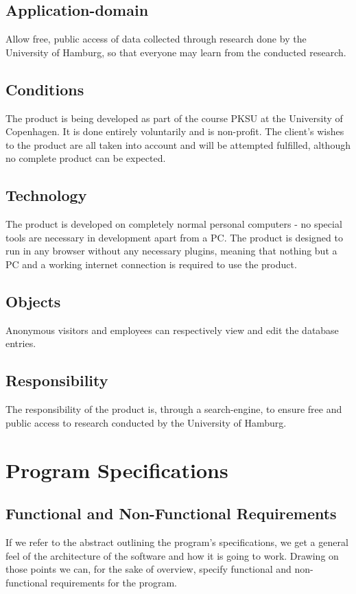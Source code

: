 \documentclass[12pt,a4paper]{article}
\begin{document}
\subsection{Application-domain}
Allow free, public access of data collected through research done by the University of Hamburg, so that everyone may learn from the conducted research.
\subsection{Conditions}
The product is being developed as part of the course PKSU at the University of Copenhagen. It is done entirely voluntarily and is non-profit. The client's wishes to the product are all taken into account and will be attempted fulfilled, although no complete product can be expected.
\subsection{Technology}
The product is developed on completely normal personal computers - no special tools are necessary in development apart from a PC.
The product is designed to run in any browser without any necessary plugins, meaning that nothing but a PC and a working internet connection is required to use the product.
\subsection{Objects}
Anonymous visitors and employees can respectively view and edit the database entries.
\subsection{Responsibility}
The responsibility of the product is, through a search-engine, to ensure free and public access to research conducted by the University of Hamburg. 
\newpage
\section{Program Specifications}
\subsection{Functional and Non-Functional Requirements}

If we refer to the abstract outlining the program's specifications, we get a general feel of the architecture of the software and how it is going to work. Drawing on those points we can, for the sake of overview, specify functional and non-functional requirements for the program.\\
\end{document}
